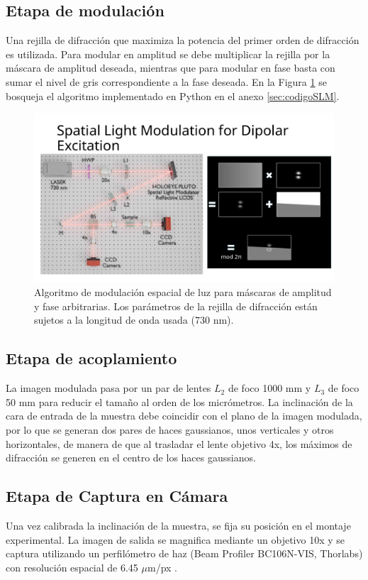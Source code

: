 \subsection{Etapa de modulación}
Una rejilla de difracción que maximiza la potencia del primer orden de difracción es utilizada. Para modular en amplitud se debe multiplicar la rejilla por la máscara de amplitud deseada, mientras que para modular en fase basta con sumar el nivel de gris correspondiente a la fase deseada. En la Figura \ref{fig:SLMblaze} se bosqueja el algoritmo implementado en Python en el anexo \ref{sec:codigoSLM}.

{
\begin{figure}
    \centering
    \includegraphics[width=0.35\linewidth, trim={19.5cm 0 0 5cm}, clip]{media/SLMblaze4.png}
    \caption[Modulación espacial de luz para máscaras de amplitud y fase arbitrarias.]{Algoritmo de modulación espacial de luz para máscaras de amplitud y fase arbitrarias. Los parámetros de la rejilla de difracción están sujetos a la longitud de onda usada (730 nm).\label{fig:SLMblaze}}
\end{figure}
}

\subsection{Etapa de acoplamiento}
La imagen modulada pasa por un par de lentes $L_2$ de foco 1000 mm y $L_3$ de foco 50 mm para reducir el tamaño al orden de los micrómetros. La inclinación de la cara de entrada de la muestra debe coincidir con el plano de la imagen modulada, por lo que se generan dos pares de haces gaussianos, unos verticales y otros horizontales, de manera de que al trasladar el lente objetivo 4x, los máximos de difracción se generen en el centro de los haces gaussianos.

\subsection{Etapa de Captura en Cámara}
Una vez calibrada la inclinación de la muestra, se fija su posición en el montaje experimental. La imagen de salida se magnifica mediante un objetivo 10x y se captura utilizando un perfilómetro de haz (Beam Profiler BC106N-VIS, Thorlabs) con resolución espacial de 6.45 $\mu$m/px \citep{thorlabs_beam_profiler}.

